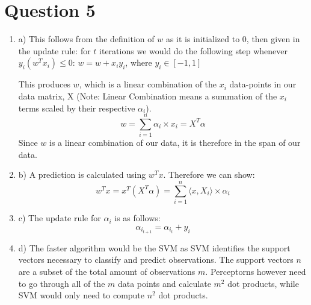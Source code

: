 \documentclass{article}
\theoremstyle{plain}
\theoremstyle{definition}
\begin{document}
\section{Question 5}
\begin{enumerate}
    \item a) This follows from the definition of $w$ as it is initialized to 0, then given in the update rule: for $t$ iterations we would do the following step whenever $y_i(w^Tx_i) \leq  0$: $w = w + x_iy_i$, where $y_i \in [-1,1]$
    
    This produces $w$, which is a linear combination of the $x_i$ data-points in our data matrix, X  (Note: Linear Combination means a summation of the $x_i$ terms scaled by their respective $\alpha_i$).
    $$
        w = \sum_{i=1}^n \alpha_i \times x_i = X^T\alpha
    $$
    Since $w$ is a linear combination of our data, it is therefore in the span of our data.
    
    \item b) A prediction is calculated using $w^Tx$. Therefore we can show:
    $$
    w^Tx =  x^T(X^T\alpha) =  \sum_{i=1}^n \langle x, X_i \rangle \times \alpha_i
    $$
   
    \item c) The update rule for $\alpha_i$ is as follows:
    $$
        \alpha_i_{t+1} = \alpha_i_{t} + y_i 
    $$
    \item d)
    The faster algorithm would be the SVM as SVM identifies the support vectors necessary to classify and predict observations. The support vectors $n$ are a subset of the total amount of observations $m$. Perceptorns however need to go through all of the $m$ data points and calculate $m^2$ dot products, while SVM would only need to compute $n^2$ dot products.
   
\end{enumerate}
\end{document}

